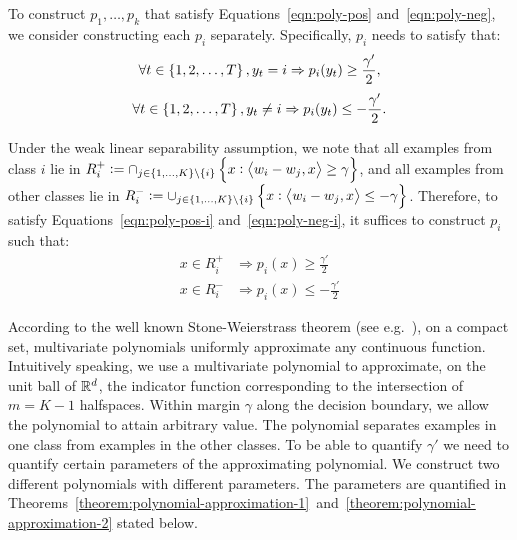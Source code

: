 To construct $p_1, \ldots, p_k$ that satisfy Equations~\eqref{eqn:poly-pos}
and~\eqref{eqn:poly-neg}, we consider constructing each $p_i$ separately.
Specifically, $p_i$ needs to satisfy that:
\begin{equation}
  \forall t \in \cbr{1,2,\ldots,T}, y_t = i \Rightarrow p_i(y_t) \geq \frac{\gamma'}2,
  \label{eqn:poly-pos-i}
\end{equation}
\begin{equation}
  \forall t \in \cbr{1,2,\ldots,T}, y_t \neq i \Rightarrow p_i(y_t) \leq -\frac{\gamma'}2.
  \label{eqn:poly-neg-i}
\end{equation}

Under the weak linear separability assumption, we note that all examples from class $i$
lie in
$R_i^+ := \cap_{j \in \cbr{1,\ldots,K} \setminus \cbr{i}} \cbr{x: \ip{w_i - w_j}{x} \geq \gamma}$, and all examples from other classes lie in
$R_i^- := \cup_{j \in \cbr{1,\ldots,K} \setminus \cbr{i}} \cbr{x: \ip{w_i - w_j}{x} \leq  -\gamma}$.
Therefore, to satisfy Equations~\eqref{eqn:poly-pos-i} and~\eqref{eqn:poly-neg-i},
it suffices to construct $p_i$ such that:
\begin{align*}
  x \in R_i^+ & \Rightarrow p_i(x) \geq \frac {\gamma'} 2\\
  x \in R_i^- & \Rightarrow p_i(x) \leq - \frac {\gamma'} 2
\end{align*}


According to the well known Stone-Weierstrass theorem (see
e.g.~\citet[Section~10.10]{Davidson-Donsig-2010}), on a compact set,
multivariate polynomials uniformly approximate any continuous function.
Intuitively speaking, we use a multivariate polynomial to approximate, on the
unit ball of $\mathbb{R}^d$, the indicator function corresponding to the intersection of
$m=K-1$ halfspaces. Within margin $\gamma$ along the decision boundary, we allow
the polynomial to attain arbitrary value. The polynomial separates examples in
one class from examples in the other classes. To be able to quantify $\gamma'$
we need to quantify certain parameters of the approximating polynomial. We
construct two different polynomials with different parameters. The parameters
are quantified in
Theorems~\ref{theorem:polynomial-approximation-1}~and~\ref{theorem:polynomial-approximation-2}
stated below.

